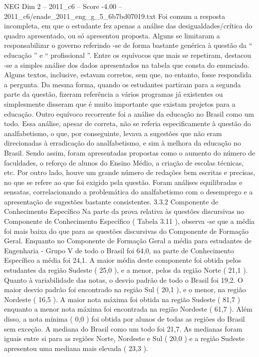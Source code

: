 \begin{textsample}{NEG Dim 2 – 2011\_c6 – Score -4.00 – 2011\_c6/enade\_2011\_eng\_g\_5\_6b7bd07019.txt}
Foi comum a resposta incompleta, em que o estudante fez apenas a análise das desigualdades/crítica do quadro apresentado, ou só apresentou proposta.
Alguns se limitaram a responsabilizar o governo referindo -se de forma bastante genérica à questão da “ educação ” e “ profissional ”.
Entre os equívocos que mais se repetiram, destacou -se a simples análise dos dados apresentados na tabela que consta do enunciado.
Alguns textos, inclusive, estavam corretos, sem que, no entanto, fosse respondida a pergunta.
Da mesma forma, quando os estudantes partiram para a segunda parte da questão, fizeram referência a vários programas já existentes ou simplesmente disseram que é muito importante que existam projetos para a educação.
Outro equívoco recorrente foi a análise da educação no Brasil como um todo.
Essa análise, apesar de correta, não se referia especificamente à questão do analfabetismo, o que, por conseguinte, levava a sugestões que não eram direcionadas à erradicação do analfabetismo, e sim à melhora da educação no Brasil.
Sendo assim, foram apresentadas propostas como o aumento do número de faculdades, o reforço de alunos do Ensino Médio, a criação de escolas técnicas, etc.
Por outro lado, houve um grande número de redações bem escritas e precisas, no que se refere ao que foi exigido pela questão.
Foram análises equilibradas e sensatas, correlacionando a problemática do analfabetismo com o desemprego e a apresentação de sugestões bastante consistentes. 3.3.2 Componente de Conhecimento Específico Na parte da prova relativa às questões discursivas no Componente de Conhecimento Específico ( Tabela 3.11 ), observa -se que a média foi mais baixa do que para as questões discursivas do Componente de Formação Geral.
Enquanto no Componente de Formação Geral a média para estudantes de Engenharia - Grupo V de todo o Brasil foi 64,0, na parte de Conhecimento Específico a média foi 24,1.
A maior média deste componente foi obtida pelos estudantes da região Sudeste ( 25,0 ), e a menor, pelos da região Norte ( 21,1 ).
Quanto à variabilidade das notas, o desvio padrão de todo o Brasil foi 19,2.
O maior desvio padrão foi encontrado na região Sul ( 20,1 ), e o menor, na região Nordeste ( 16,5 ).
A maior nota máxima foi obtida na região Sudeste ( 81,7 ) enquanto a menor nota máxima foi encontrada na região Nordeste ( 61,7 ).
Além disso, a nota mínima ( 0,0 ) foi obtida por alunos de todas as regiões do Brasil sem exceção.
A mediana do Brasil como um todo foi 21,7.
As medianas foram iguais entre si para as regiões Norte, Nordeste e Sul ( 20,0 ) e a região Sudeste apresentou uma mediana mais elevada ( 23,3 ).

\end{textsample}
